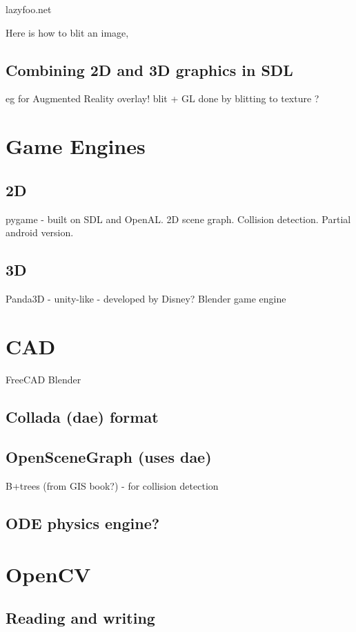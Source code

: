 \documentclass[oneside,english]{scrbook}
\begin{document}
lazyfoo.net

Here is how to blit an image,



\section{Combining 2D and 3D graphics in SDL}
eg for Augmented Reality overlay!
blit + GL
done by blitting to texture ?

\chapter{Game Engines}
\section{2D}
pygame - built on SDL and OpenAL.  2D scene graph. Collision detection. Partial android version.

\section{3D}
Panda3D - unity-like - developed by Disney?
Blender game engine

\chapter{CAD}
FreeCAD
Blender

\section{Collada (dae) format}


\section{OpenSceneGraph (uses dae)}
B+trees (from GIS book?) - for collision detection

\section{ODE physics engine?}

\chapter{OpenCV}


\section{Reading and writing}
\end{document}
